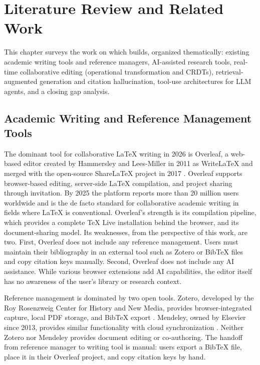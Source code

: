 \chapter{Literature Review and Related Work}
\label{ch:literature}

This chapter surveys the work on which \sh{} builds, organized thematically: existing academic writing tools and reference managers, AI-assisted research tools, real-time collaborative editing (operational transformation and CRDTs), retrieval-augmented generation and citation hallucination, tool-use architectures for LLM agents, and a closing gap analysis.

\section{Academic Writing and Reference Management Tools}
\label{sec:lit-tools}

The dominant tool for collaborative LaTeX writing in 2026 is Overleaf, a web-based editor created by Hammersley and Lees-Miller in 2011 as WriteLaTeX and merged with the open-source ShareLaTeX project in 2017 \cite{overleaf2024}. Overleaf supports browser-based editing, server-side LaTeX compilation, and project sharing through invitation. By 2025 the platform reports more than 20 million users worldwide and is the de facto standard for collaborative academic writing in fields where LaTeX is conventional. Overleaf's strength is its compilation pipeline, which provides a complete TeX Live installation behind the browser, and its document-sharing model. Its weaknesses, from the perspective of this work, are two. First, Overleaf does not include any reference management. Users must maintain their bibliography in an external tool such as Zotero or BibTeX files and copy citation keys manually. Second, Overleaf does not include any AI assistance. While various browser extensions add AI capabilities, the editor itself has no awareness of the user's library or research context.

Reference management is dominated by two open tools. Zotero, developed by the Roy Rosenzweig Center for History and New Media, provides browser-integrated capture, local PDF storage, and BibTeX export \cite{zotero2024}. Mendeley, owned by Elsevier since 2013, provides similar functionality with cloud synchronization \cite{mendeley2024}. Neither Zotero nor Mendeley provides document editing or co-authoring. The handoff from reference manager to writing tool is manual: users export a BibTeX file, place it in their Overleaf project, and copy citation keys by hand.

